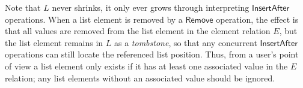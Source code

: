 Note that $L$ never shrinks, it only ever grows through interpreting $\mathsf{InsertAfter}$ operations.
When a list element is removed by a $\mathsf{Remove}$ operation, the effect is that all values are removed from the list element in the element relation $E$, but the list element remains in $L$ as a \emph{tombstone}, so that any concurrent $\mathsf{InsertAfter}$ operations can still locate the referenced list position.
Thus, from a user's point of view a list element only exists if it has at least one associated value in the $E$ relation; any list elements without an associated value should be ignored.
